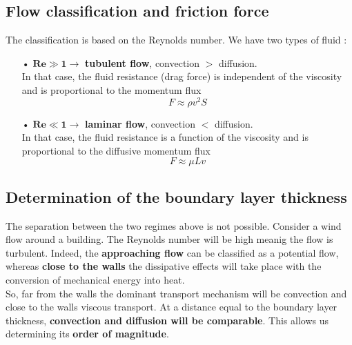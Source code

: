 \subsection{Flow classification and friction force}
The classification is based on the Reynolds number. We have two types of fluid : \\
	
\begin{itemize}
	\item[•] $\mathbf{Re \gg 1 \rightarrow}$ \textbf{tubulent flow}, convection $>$ diffusion. \\
	      In that case, the fluid resistance (drag force) is independent of the viscosity and is proportional to the momentum flux 
	      \begin{equation}
	      	F \approx \rho v^2 S
	      \end{equation}
	      
	\item[•] $\mathbf{Re \ll 1 \rightarrow}$ \textbf{laminar flow}, convection $<$ diffusion. \\
	      In that case, the fluid resistance is a function of the viscosity and is proportional to the diffusive momentum flux
	      \begin{equation}
	      	F \approx \mu L v
	      \end{equation}
\end{itemize}
	
\subsection{Determination of the boundary layer thickness}
The separation between the two regimes above is not possible. Consider a wind flow around a building. The Reynolds number will be high meanig the flow is turbulent. Indeed, the \textbf{approaching flow} can be classified as a potential flow, whereas \textbf{close to the walls} the dissipative effects will take place with the conversion of mechanical energy into heat. \\
So, far from the walls the dominant transport mechanism will be convection and close to the walls viscous transport. At a distance equal to the boundary layer thickness, \textbf{convection and diffusion will be comparable}. This allows us determining its \textbf{order of magnitude}.
	
